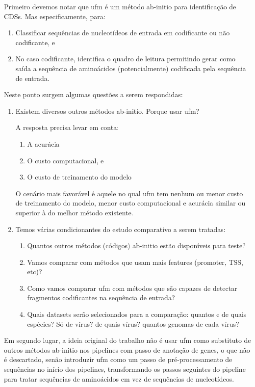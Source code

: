 \documentclass[12pt]{article}
\begin{document}
Primeiro devemos notar que \gls{ufm} é um método ab-initio para identificação de CDSs. Mas especificamente, para:
\begin{enumerate}
    \item Classificar sequências de nucleotídeos de entrada em codificante ou não codificante, e
    \item No caso codificante, identifica o quadro de leitura permitindo gerar como saída a sequência de aminoácidos (potencialmente) codificada pela sequência de entrada.
\end{enumerate}
Neste ponto surgem algumas questões a serem respondidas:
\begin{enumerate}
    \item Existem diversos outros métodos ab-initio. Porque usar \gls{ufm}?

          A resposta precisa levar em conta:
          \begin{enumerate}
              \item A acurácia
              \item O custo computacional, e
              \item O custo de treinamento do modelo
          \end{enumerate}

          O cenário mais favorável é aquele no qual \gls{ufm} tem nenhum ou menor custo de treinamento do modelo, menor custo computacional e acurácia similar ou superior à do melhor método existente.

    \item Temos várias condicionantes do estudo comparativo a serem tratadas:

          \begin{enumerate}
              \item  Quantos outros métodos (códigos) ab-initio estão disponíveis para teste?

              \item Vamos comparar com métodos que usam mais features (promoter, TSS, etc)?

              \item Como vamos comparar \gls{ufm} com métodos que são capazes de detectar fragmentos codificantes na sequência de entrada?

              \item Quais datasets serão selecionados para a comparação: quantos e de quais espécies? Só de vírus? de quais vírus? quantos genomas de cada vírus?
          \end{enumerate}

\end{enumerate}
Em segundo lugar, a ideia original do trabalho não é usar \gls{ufm} como substituto de outros métodos ab-initio nos pipelines com passo de anotação de genes, o que não é descartado, senão introduzir \gls{ufm} como um passo de pré-processamento de sequências no início dos pipelines, transformando os passos seguintes do pipeline para tratar sequências de aminoácidos em vez de sequências de nucleotídeos.
\end{document}
